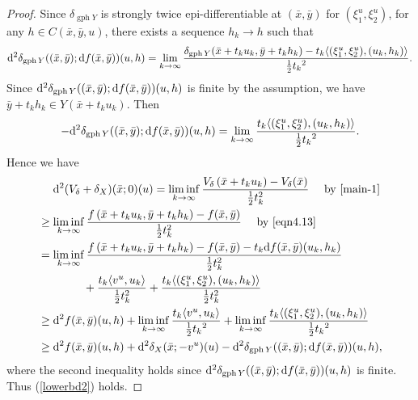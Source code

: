 \documentclass[11pt]{article}
\numberwithin{equation}{section}
\begin{document}
{\begin{proof}
Since $\delta_{\operatorname{gph} Y}$ is strongly twice epi-differentiable at $(\bar x,\bar y)$ for $(\xi_1^u,\xi_2^u)$, for any $h \in C(\bar x,\bar y,u)$,  there exists a sequence $ h_k\rightarrow h$ such that 
$$ {\rm d}^2 \delta_{\operatorname{gph} Y} ((\bar x,\bar y); {\rm d}f(\bar x,\bar y))(u,h)=\lim_{k\rightarrow \infty}\frac{\delta_{\operatorname{gph}Y}(\bar x+t_ku_k,\bar y+t_kh_k)  - t_k \langle (\xi_1^u,\xi_2^u), (u_k,h_k)\rangle}{\frac{1}{2}{t_k}^2} .$$
Since ${\rm d}^2 \delta_{\operatorname{gph} Y} ((\bar x,\bar y); {\rm d}f(\bar x,\bar y))(u,h)$ is finite by the assumption, we have $\bar y+t_kh_k \in Y(\bar x+t_ku_k)$. Then
\begin{equation}\label{eqn4.16}-{\rm d}^2 \delta_{\operatorname{gph} Y}((\bar x,\bar y);{\rm d}f(\bar x,\bar y))(u,h)=\lim\limits_{k \to \infty}\frac{t_k\langle (\xi_1^u,\xi_2^u), (u_k,h_k)\rangle}{\frac{1}{2}{t_k}^2}.\end{equation}
Hence we have
\begin{eqnarray*}\label{}
	\begin{aligned}
		& \quad\ {\rm d}^2 (V_{\delta}+\delta_X)(\bar x;0)(u)  = \liminf\limits_{k \to \infty} \frac{V_{\delta}\left(\bar{x}+t_ku_k\right)-V_{\delta}(\bar{x})}{\frac{1}{2} t_k^2}  \quad \mbox{ by } \eqref{main-1}\\
		&\geq \liminf\limits_{k \to \infty} \frac{f\left(\bar{x}+t_k u_k, \bar{y}+t_k h_k\right)-f(\bar{x}, \bar{y})}{\frac{1}{2} t_k^2}\quad \mbox{ by } \eqref{eqn4.13}\\
		&= \liminf\limits_{k \to \infty} \frac{f\left(\bar{x}+t_k u_k, \bar{y}+t_k h_k\right)-f(\bar{x}, \bar{y})-t_k{\rm d}f(\bar{x}, \bar{y})(u_k,h_k)}{\frac{1}{2} t_k^2} \\
		& \quad\quad\quad\quad + \frac{t_k \langle v^u,u_k \rangle}{\frac{1}{2}t_k^2} +\frac{t_k \langle (\xi_1^u,\xi_2^u), (u_k,h_k)\rangle}{\frac{1}{2}t_k^2}  \\
		&\geq {\rm d}^2 f(\bar x,\bar y)(u,h) + \liminf_{k \to \infty} \frac{t_k \langle v^u,u_k \rangle}{\frac{1}{2}{t_k}^2} +  \liminf_{k \to \infty}\frac{t_k \langle (\xi_1^u,\xi_2^u), (u_k,h_k)\rangle}{\frac{1}{2}{t_k}^2}    \\
&\geq {\rm d}^2 f(\bar x,\bar y)(u,h) + {\rm d}^2 \delta_X(\bar x;-v^u)(u) -{\rm d}^2 \delta_{\operatorname{gph}Y}((\bar x,\bar y);{\rm d}f(\bar x,\bar y))(u,h),
	\end{aligned}
\end{eqnarray*}
where the second inequality holds since ${\rm d}^2 \delta_{\operatorname{gph} Y}((\bar x,\bar y);{\rm d}f(\bar x,\bar y))(u,h)$ is finite.
Thus (\ref{lowerbd2}) holds.



\end{proof}}
\end{document}
